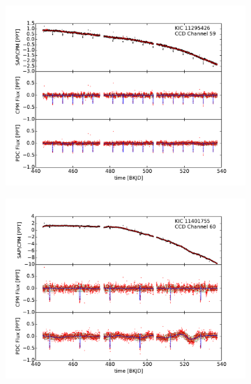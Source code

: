 \documentclass[12pt, preprint]{aastex}
\begin{document}
\begin{figure}[htb]
\centering
\begin{subfigure}[htb]{0.33\textwidth}
\includegraphics[width=\textwidth]{kic_11295426_pdc}
\end{subfigure}%
\hfill
\begin{subfigure}[htb]{0.33\textwidth}
\includegraphics[width=\textwidth]{kic_11401755_pdc}
\end{subfigure}%
\hfill
\begin{subfigure}[htb]{0.33\textwidth}

\end{subfigure}
\end{figure}
\end{document}
